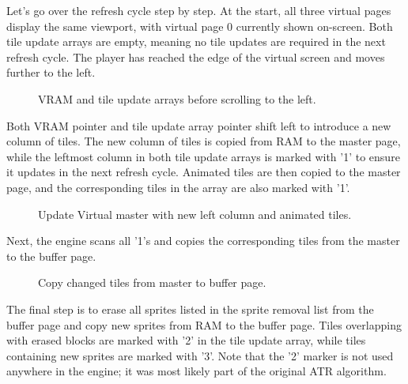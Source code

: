 \documentclass[book.tex]{subfiles}
\begin{document}
\vspace{0.5cm}
\par
\begin{minipage}{\textwidth}
  
\end{minipage}



\pagebreak
Let's go over the refresh cycle step by step. At the start, all three virtual pages display the same viewport, with virtual page 0 currently shown on-screen. Both tile update arrays are empty, meaning no tile updates are required in the next refresh cycle. The player has reached the edge of the virtual screen and moves further to the left. \\

\begin{figure}[H]
\centering
 \caption{VRAM and tile update arrays before scrolling to the left.}
 \label{fig:kc4_6_step0}
\end{figure}

\par
Both VRAM  pointer and tile update array pointer shift left to introduce a new column of tiles. The new column of tiles is copied from RAM to the master page, while the leftmost column in both tile update arrays is marked with '1' to ensure it updates in the next refresh cycle. Animated tiles are then copied to the master page, and the corresponding tiles in the array are also marked with '1'.\\


\vspace{-5pt}
\begin{figure}[H]
\centering
 \caption{Update Virtual master with new left column and animated tiles.}
 \label{fig:kc4_6_step1}
\end{figure}

\pagebreak
Next, the engine scans all '1's and copies the corresponding tiles from the master to the buffer page. \\

\vspace{-5pt}
\begin{figure}[H]
\centering
 \caption{Copy changed tiles from master to buffer page.}
 \label{fig:kc4_6_step2}
\end{figure}


\par
The final step is to erase all sprites listed in the sprite removal list from the buffer page and copy new sprites from RAM to the buffer page. Tiles overlapping with erased blocks are marked with '2' in the tile update array, while tiles containing new sprites are marked with '3'. Note that the '2' marker is not used anywhere in the engine; it was most likely part of the original ATR algorithm.\\
\end{document}
